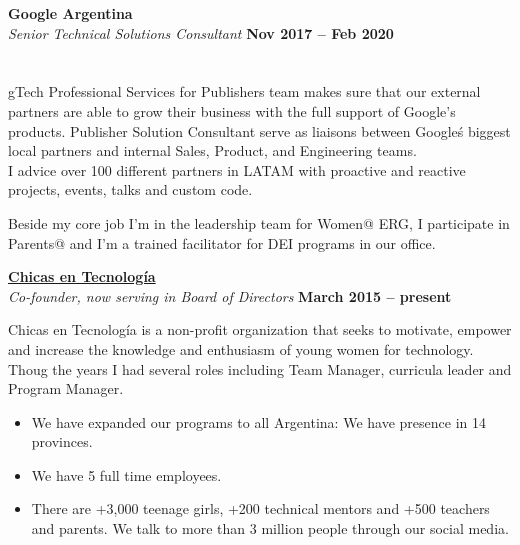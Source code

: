 \documentclass[margin,line]{resume}
\begin{document}
\begin{resume}
\textbf{Google Argentina}\vspace{2mm}\\\vspace{1mm}
\textsl{Senior Technical Solutions Consultant} 
 \hfill \textbf{Nov 2017 -- Feb 2020}\vspace{-3mm}\\\vspace{-1mm}
\hfill \vspace{-3mm}\\\vspace{-1mm}
\\
gTech Professional Services for Publishers team makes sure that our external partners are able to grow their business with the full support of Google's products. Publisher Solution Consultant serve as liaisons between Google\'s biggest local partners and internal Sales, Product, and Engineering teams. 
\\
I advice over 100 different partners in LATAM with proactive and reactive projects, events, talks and custom code.

Beside my core job I'm in the leadership team for Women@ ERG, I participate in Parents@ and I'm a trained facilitator for DEI programs in our office.
 


\textbf{\href{http://www.chicasentecnologia.org/}{Chicas en Tecnolog\'ia}}\\\vspace{1mm}
\textsl{Co-founder, now serving in Board of Directors} \hfill \textbf{March 2015 -- present}\vspace{-3mm}\\\vspace{-1mm}

Chicas en Tecnolog\'ia is a non-profit organization that seeks to motivate, empower and increase the knowledge and enthusiasm of young women for technology.
Thoug the years I had several roles including Team Manager, curricula leader and Program Manager.

\begin{itemize}

\item We have expanded our programs to all Argentina: We have presence in 14 provinces.

\item We have 5 full time employees.

\item There are +3,000 teenage girls,  +200 technical mentors and +500 teachers and parents. We talk to more than 3 million people through our social media.


\end{itemize}
\end{resume}
\end{document}
